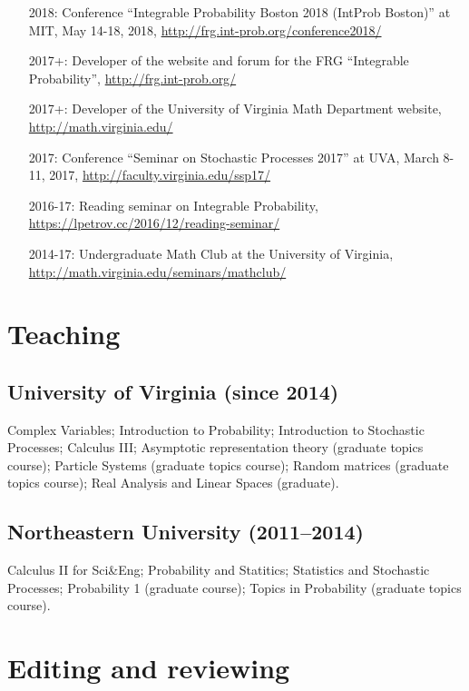 \documentclass[letterpaper,11pt]{article}
\begin{document}
\begin{itemize}
	\item [2018:]
		Conference 
		``Integrable Probability Boston 2018 (IntProb Boston)''
		at MIT,
		May 14-18, 2018,
		\url{http://frg.int-prob.org/conference2018/}

	\item [2017+:]
		Developer of the website and forum for the FRG ``Integrable Probability'',
		\url{http://frg.int-prob.org/}

	\item [2017+:]
		Developer of the University of Virginia Math Department website,
		\url{http://math.virginia.edu/}
	\item
	      [2017:] Conference
	      ``Seminar on Stochastic Processes 2017'' at UVA,
				March 8-11, 2017,
	      \url{http://faculty.virginia.edu/ssp17/}
	\item
	      [2016-17:]
				Reading seminar on Integrable Probability,
	      \url{https://lpetrov.cc/2016/12/reading-seminar/}
	\item
	      [2014-17:]
				Undergraduate Math Club at the University of Virginia,
	      \url{http://math.virginia.edu/seminars/mathclub/}
\end{itemize}

\section*{Teaching}

\subsection*{University of Virginia (since 2014)}

Complex Variables;
Introduction to Probability; 
Introduction to Stochastic Processes;
Calculus III;
Asymptotic representation theory (graduate topics course);
Particle Systems (graduate topics course);
Random matrices (graduate topics course);
Real Analysis and Linear Spaces (graduate).

\subsection*{Northeastern University (2011--2014)}

Calculus II for Sci\&Eng;
Probability and Statitics;
Statistics and Stochastic Processes; 
Probability 1 (graduate course);
Topics in Probability (graduate topics course).

\section*{Editing and reviewing}
\end{document}
